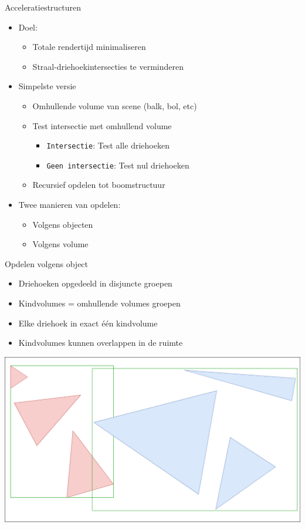 \documentclass[11pt,t]{beamer}
\begin{document}
\begin{frame}{Acceleratiestructuren}
	\begin{itemize}
		\item Doel:
		\begin{itemize}
			\item Totale rendertijd minimaliseren
			\item Straal-driehoekintersecties te verminderen
		\end{itemize}
		\pause
		\item Simpelste versie
		\begin{itemize}
			\item Omhullende volume van scene (balk, bol, etc)
			\item Test intersectie met omhullend volume
				\begin{itemize}
					\item \texttt{Intersectie}: \qquad\qquad Test alle driehoeken
					\item \texttt{Geen intersectie}: \qquad Test nul driehoeken
				\end{itemize}
			\item Recursief opdelen tot boomstructuur
		\end{itemize}
		\pause
		\item Twee manieren van opdelen:
			\begin{itemize}
				\item Volgens objecten
				\item Volgens volume
			\end{itemize}
	\end{itemize}

\end{frame}

\begin{frame}{Opdelen volgens object}
	\begin{itemize}
		\item Driehoeken opgedeeld in disjuncte groepen
		\item Kindvolumes = omhullende volumes groepen
		\item Elke driehoek in exact één kindvolume
		\item Kindvolumes kunnen overlappen in de ruimte
	\end{itemize}
	\pause
	\vspace{5pt}
	\hspace{20pt}
	\includegraphics[height=.4\paperheight]{../img/objectSplit}
\end{frame}
\end{document}
